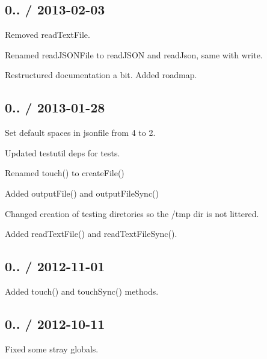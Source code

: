 \subsection*{0.. / 2013-\/02-\/03 }


\begin{DoxyItemize}
\item Removed {\ttfamily read\+Text\+File}.
\item Renamed {\ttfamily read\+J\+S\+O\+N\+File} to {\ttfamily read\+J\+S\+ON} and {\ttfamily read\+Json}, same with write.
\item Restructured documentation a bit. Added roadmap.
\end{DoxyItemize}

\subsection*{0.. / 2013-\/01-\/28 }


\begin{DoxyItemize}
\item Set default spaces in {\ttfamily jsonfile} from 4 to 2.
\item Updated {\ttfamily testutil} deps for tests.
\item Renamed {\ttfamily touch()} to {\ttfamily create\+File()}
\item Added {\ttfamily output\+File()} and {\ttfamily output\+File\+Sync()}
\item Changed creation of testing diretories so the /tmp dir is not littered.
\item Added {\ttfamily read\+Text\+File()} and {\ttfamily read\+Text\+File\+Sync()}.
\end{DoxyItemize}

\subsection*{0.. / 2012-\/11-\/01 }


\begin{DoxyItemize}
\item Added {\ttfamily touch()} and {\ttfamily touch\+Sync()} methods.
\end{DoxyItemize}

\subsection*{0.. / 2012-\/10-\/11 }


\begin{DoxyItemize}
\item Fixed some stray globals.
\end{DoxyItemize}

